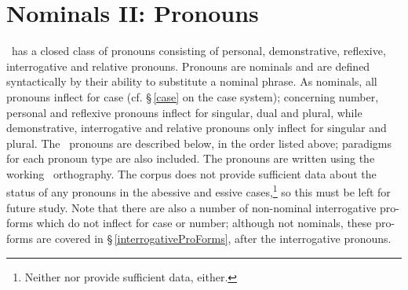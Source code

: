 

\chapter{Nominals II: Pronouns}\label{pronouns}
\PS\ has a closed class of pronouns consisting of personal, demonstrative, reflexive, interrogative and relative pronouns. Pronouns are nominals and are defined syntactically by their ability to substitute a nominal phrase. 
As nominals, all pronouns inflect for case (cf. §\,\ref{case} on the case system); concerning number, personal and reflexive pronouns inflect for singular, dual and plural, while demonstrative, interrogative and relative pronouns only inflect for singular and plural. 
The \PS\ pronouns are described below, in the order listed above; paradigms for each pronoun type are also included. The pronouns are written using the working \PS\ orthography. The corpus does not provide sufficient data about the status of any pronouns in the abessive and essive cases,\footnote{Neither \citet{Lagercrantz1926} nor \citet{Lehtiranta1992} provide sufficient data, either.} 
so this must be left for future study. 
Note that there are also a number of non-nominal interrogative pro-forms which do not inflect for case or number; although not nominals, these pro-forms are covered in §\,\ref{interrogativeProForms}, after the interrogative pronouns. 


